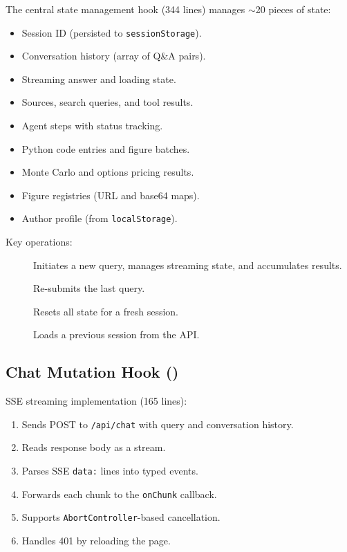 The central state management hook (344 lines) manages $\sim$20 pieces of state:

\begin{itemize}
  \item Session ID (persisted to \texttt{sessionStorage}).
  \item Conversation history (array of Q\&A pairs).
  \item Streaming answer and loading state.
  \item Sources, search queries, and tool results.
  \item Agent steps with status tracking.
  \item Python code entries and figure batches.
  \item Monte Carlo and options pricing results.
  \item Figure registries (URL and base64 maps).
  \item Author profile (from \texttt{localStorage}).
\end{itemize}

Key operations:
\begin{description}
  \item[] Initiates a new query, manages streaming state, and accumulates results.
  \item[] Re-submits the last query.
  \item[] Resets all state for a fresh session.
  \item[] Loads a previous session from the API.
\end{description}

\subsection{Chat Mutation Hook ()}

SSE streaming implementation (165 lines):

\begin{enumerate}
  \item Sends POST to \texttt{/api/chat} with query and conversation history.
  \item Reads response body as a stream.
  \item Parses SSE \texttt{data:} lines into typed events.
  \item Forwards each chunk to the \texttt{onChunk} callback.
  \item Supports \texttt{AbortController}-based cancellation.
  \item Handles 401 by reloading the page.
\end{enumerate}

